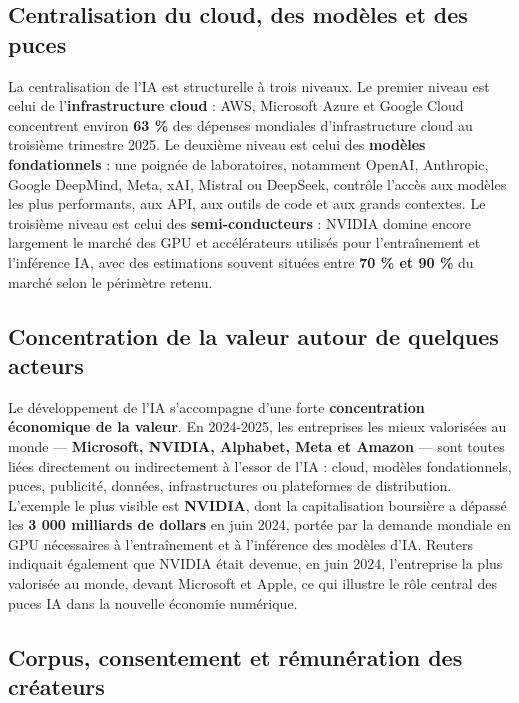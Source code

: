 \documentclass[
  10pt,
  a4paper,
  DIV=11,
  numbers=noendperiod,
  oneside]{scrreprt}
\let\oldtextbf\textbf
\renewcommand{\textbf}[1]{\oldtextbf{\textcolor{cmmnavy}{#1}}}
\begin{document}
\subsection{Centralisation du cloud, des modèles et des
puces}\label{centralisation-du-cloud-des-moduxe8les-et-des-puces}

La centralisation de l'IA est structurelle à trois niveaux. Le premier
niveau est celui de l'\textbf{infrastructure cloud} : AWS, Microsoft
Azure et Google Cloud concentrent environ \textbf{63 \%} des dépenses
mondiales d'infrastructure cloud au troisième trimestre 2025. Le
deuxième niveau est celui des \textbf{modèles fondationnels} : une
poignée de laboratoires, notamment OpenAI, Anthropic, Google DeepMind,
Meta, xAI, Mistral ou DeepSeek, contrôle l'accès aux modèles les plus
performants, aux API, aux outils de code et aux grands contextes. Le
troisième niveau est celui des \textbf{semi-conducteurs} : NVIDIA domine
encore largement le marché des GPU et accélérateurs utilisés pour
l'entraînement et l'inférence IA, avec des estimations souvent situées
entre \textbf{70 \% et 90 \%} du marché selon le périmètre retenu.

\subsection{Concentration de la valeur autour de quelques
acteurs}\label{concentration-de-la-valeur-autour-de-quelques-acteurs}

Le développement de l'IA s'accompagne d'une forte \textbf{concentration
économique de la valeur}. En 2024-2025, les entreprises les mieux
valorisées au monde --- \textbf{Microsoft, NVIDIA, Alphabet, Meta et
Amazon} --- sont toutes liées directement ou indirectement à l'essor de
l'IA : cloud, modèles fondationnels, puces, publicité, données,
infrastructures ou plateformes de distribution. L'exemple le plus
visible est \textbf{NVIDIA}, dont la capitalisation boursière a dépassé
les \textbf{3 000 milliards de dollars} en juin 2024, portée par la
demande mondiale en GPU nécessaires à l'entraînement et à l'inférence
des modèles d'IA. Reuters indiquait également que NVIDIA était devenue,
en juin 2024, l'entreprise la plus valorisée au monde, devant Microsoft
et Apple, ce qui illustre le rôle central des puces IA dans la nouvelle
économie numérique.

\subsection{Corpus, consentement et rémunération des
créateurs}\label{corpus-consentement-et-ruxe9munuxe9ration-des-cruxe9ateurs}
\end{document}
